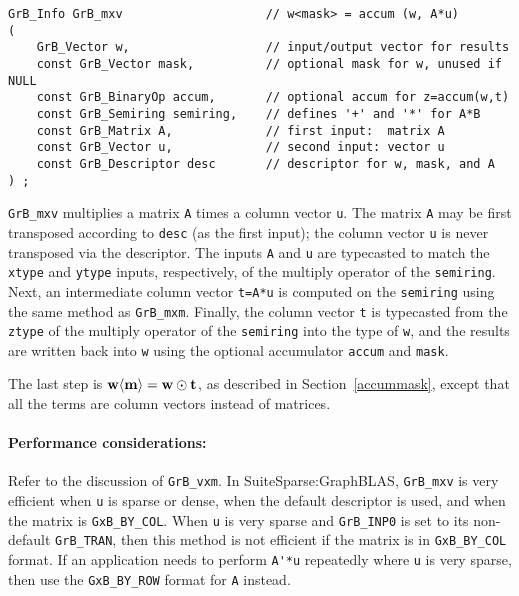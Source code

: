 \documentclass[12pt]{article}
\begin{document}
\begin{mdframed}[userdefinedwidth=6in]
{\footnotesize
\begin{verbatim}
GrB_Info GrB_mxv                    // w<mask> = accum (w, A*u)
(
    GrB_Vector w,                   // input/output vector for results
    const GrB_Vector mask,          // optional mask for w, unused if NULL
    const GrB_BinaryOp accum,       // optional accum for z=accum(w,t)
    const GrB_Semiring semiring,    // defines '+' and '*' for A*B
    const GrB_Matrix A,             // first input:  matrix A
    const GrB_Vector u,             // second input: vector u
    const GrB_Descriptor desc       // descriptor for w, mask, and A
) ;
\end{verbatim} } \end{mdframed}

\verb'GrB_mxv' multiplies a matrix \verb'A' times a column vector \verb'u'.
The matrix \verb'A' may be first transposed according to \verb'desc' (as the
first input); the column vector \verb'u' is never transposed via the
descriptor.  The inputs \verb'A' and \verb'u' are typecasted to match the
\verb'xtype' and \verb'ytype' inputs, respectively, of the multiply operator of
the \verb'semiring'. Next, an intermediate column vector \verb't=A*u' is
computed on the \verb'semiring' using the same method as \verb'GrB_mxm'.
Finally, the column vector \verb't' is typecasted from the \verb'ztype' of the
multiply operator of the \verb'semiring' into the type of \verb'w', and the
results are written back into \verb'w' using the optional accumulator
\verb'accum' and \verb'mask'.

The last step is ${\bf w \langle m \rangle  = w \odot t}$, as described
in Section~\ref{accummask}, except that all the terms are column vectors instead
of matrices.

\paragraph{\bf Performance considerations:} %
Refer to the discussion of \verb'GrB_vxm'.  In SuiteSparse:GraphBLAS,
\verb'GrB_mxv' is very efficient when \verb'u' is sparse or dense, when the
default descriptor is used, and when the matrix is \verb'GxB_BY_COL'.  When
\verb'u' is very sparse and \verb'GrB_INP0' is set to its non-default
\verb'GrB_TRAN', then this method is not efficient if the matrix is in
\verb'GxB_BY_COL' format.  If an application needs to perform \verb"A'*u"
repeatedly where \verb'u' is very sparse, then use the \verb'GxB_BY_ROW' format
for \verb'A' instead.
\end{document}
